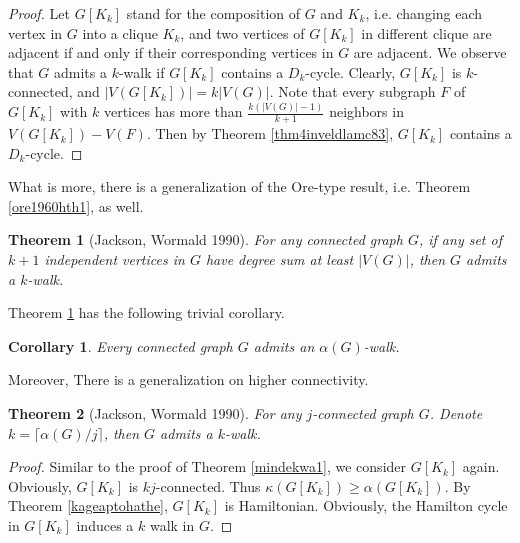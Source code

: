 \documentclass[12pt]{report}
\newtheorem{theorem}{Theorem}
\newtheorem{corollary}{Corollary}
\begin{document}
\begin{proof}
Let $G[K_k]$ stand for the composition of $G$ and $K_k$, i.e. changing each vertex in $G$ into a clique $K_k$, and two vertices of $G[K_k]$ in different clique are adjacent if and only if their corresponding vertices in $G$ are adjacent. We observe that $G$ admits a $k$-walk if $G[K_k]$ contains a $D_k$-cycle. Clearly, $G[K_k]$ is $k$-connected, and $|V(G[K_k])|=k|V(G)|$. Note that every subgraph $F$ of $G[K_k]$ with $k$ vertices has more than $\frac{k(|V(G)|-1)}{k+1}$ neighbors in $V(G[K_k])-V(F)$. Then by Theorem \ref{thm4inveldlamc83}, $G[K_k]$ contains a $D_k$-cycle.




\end{proof}


What is more, there is a generalization of the Ore-type result, i.e. Theorem \ref{ore1960hth1}, as well.

\begin{theorem}[Jackson, Wormald 1990]\label{oretjacw1}
For any connected graph $G$, if any set of $k+1$ independent vertices in $G$ have degree sum at least $|V(G)|$, then $G$ admits a $k$-walk.
\end{theorem}


Theorem \ref{oretjacw1} has the following trivial corollary.
\begin{corollary}\label{cooretjacw1}
Every connected graph $G$ admits an $\alpha(G)$-walk.
\end{corollary}


Moreover, There is a generalization on higher connectivity.

\begin{theorem}[Jackson, Wormald 1990]\label{alphkwjc1}
For any $j$-connected graph $G$. Denote $k=\lceil\alpha(G)/j\rceil$, then $G$ admits a $k$-walk.
\end{theorem}


\begin{proof}
Similar to the proof of Theorem \ref{mindekwa1}, we consider $G[K_k]$ again. Obviously, $G[K_k]$ is $kj$-connected. Thus $\kappa(G[K_k])\ge\alpha(G[K_k])$. By Theorem \ref{kageaptohathe}, $G[K_k]$ is Hamiltonian. Obviously, the Hamilton cycle in $G[K_k]$ induces a $k$ walk in $G$.
\end{proof}
\end{document}
